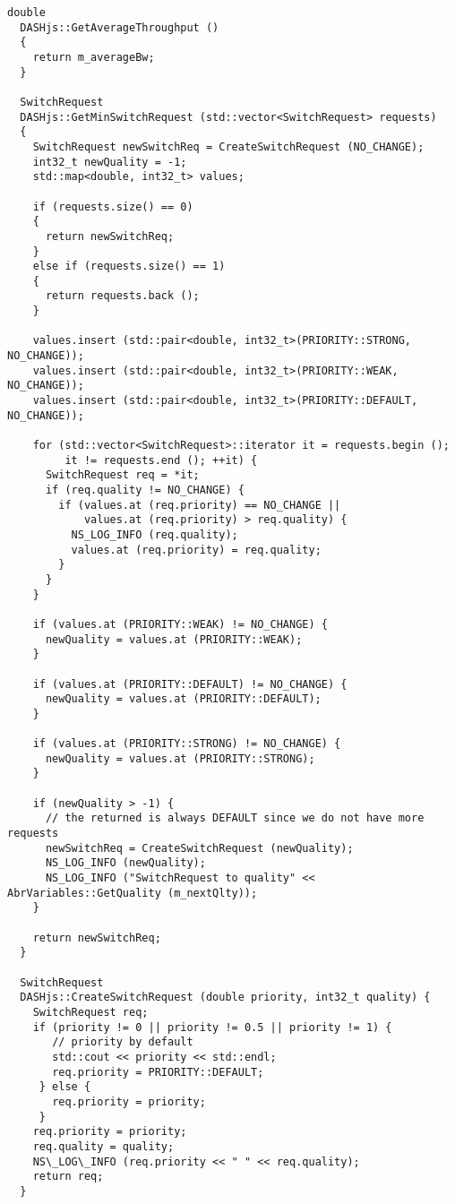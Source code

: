 \begin{lstlisting}[language=myC++, caption={DASHjs.cc}, captionpos=b]
  double
  DASHjs::GetAverageThroughput ()
  {
    return m_averageBw;
  }

  SwitchRequest
  DASHjs::GetMinSwitchRequest (std::vector<SwitchRequest> requests)
  {
    SwitchRequest newSwitchReq = CreateSwitchRequest (NO_CHANGE);
    int32_t newQuality = -1;
    std::map<double, int32_t> values;
  
    if (requests.size() == 0)
    {
      return newSwitchReq;
    }
    else if (requests.size() == 1)
    {
      return requests.back ();
    }
  
    values.insert (std::pair<double, int32_t>(PRIORITY::STRONG, NO_CHANGE));
    values.insert (std::pair<double, int32_t>(PRIORITY::WEAK, NO_CHANGE));
    values.insert (std::pair<double, int32_t>(PRIORITY::DEFAULT, NO_CHANGE));
  
    for (std::vector<SwitchRequest>::iterator it = requests.begin ();
         it != requests.end (); ++it) {
      SwitchRequest req = *it;
      if (req.quality != NO_CHANGE) {
        if (values.at (req.priority) == NO_CHANGE ||
            values.at (req.priority) > req.quality) {
          NS_LOG_INFO (req.quality);
          values.at (req.priority) = req.quality;
        }
      }
    }
  
    if (values.at (PRIORITY::WEAK) != NO_CHANGE) {
      newQuality = values.at (PRIORITY::WEAK);
    }
  
    if (values.at (PRIORITY::DEFAULT) != NO_CHANGE) {
      newQuality = values.at (PRIORITY::DEFAULT);
    }
  
    if (values.at (PRIORITY::STRONG) != NO_CHANGE) {
      newQuality = values.at (PRIORITY::STRONG);
    }
  
    if (newQuality > -1) {
      // the returned is always DEFAULT since we do not have more requests
      newSwitchReq = CreateSwitchRequest (newQuality);
      NS_LOG_INFO (newQuality);
      NS_LOG_INFO ("SwitchRequest to quality" << AbrVariables::GetQuality (m_nextQlty));
    }
  
    return newSwitchReq;
  }
  
  SwitchRequest
  DASHjs::CreateSwitchRequest (double priority, int32_t quality) {
    SwitchRequest req;
    if (priority != 0 || priority != 0.5 || priority != 1) {
       // priority by default
       std::cout << priority << std::endl;
       req.priority = PRIORITY::DEFAULT;
     } else {
       req.priority = priority;
     }
    req.priority = priority;
    req.quality = quality;
    NS\_LOG\_INFO (req.priority << " " << req.quality);
    return req;
  }
  

\end{lstlisting}
